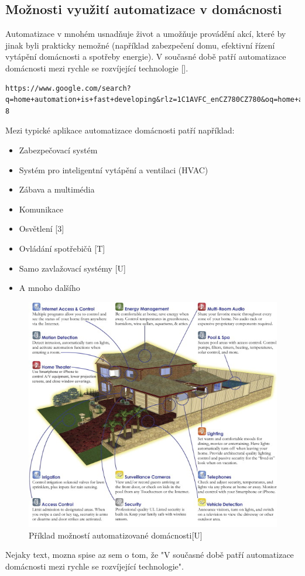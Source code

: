 \subsection*{Možnosti využití automatizace v domácnosti}
Automatizace v mnohém usnadňuje život a umožňuje provádění akcí, které by jinak byli prakticky nemožné (například zabezpečení domu, efektivní řízení vytápění domácnosti a spotřeby energie). V současné době patří automatizace domácnosti mezi rychle se rozvíjející technologie  []. 
\begin{verbatim}
https://www.google.com/search?q=home+automation+is+fast+developing&rlz=1C1AVFC_enCZ780CZ780&oq=home+automation+is+fast+deveopin&aqs=chrome.1.69i57j33i10i160.14343j0j7&sourceid=chrome&ie=UTF-8
\end{verbatim} 
Mezi typické aplikace automatizace domácnosti patří například:
\begin{itemize}
\item Zabezpečovací systém
\item Systém pro inteligentní vytápění a ventilaci (HVAC)
\item Zábava a multimédia
\item Komunikace
\item Osvětlení [3]
\item Ovládání spotřebičů [T]
\item Samo zavlažovací systémy [U]
\item A mnoho dalšího
\end{itemize}

\begin{figure}[hbt]
	\centering
	\includegraphics{obrazky/automation-example.jpg}
	\caption{Příklad možností automatizované domácnosti[U]}
	\label{asd}
\end{figure}
Nejaky text, mozna spise az sem o tom, že "V současné době patří automatizace domácnosti mezi rychle se rozvíjející technologie".



